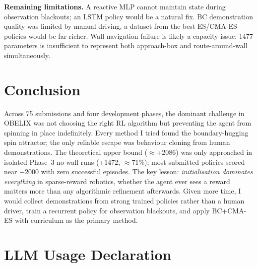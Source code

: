 \documentclass[11pt, oneside]{article}
\begin{document}
\textbf{Remaining limitations.} A reactive MLP cannot maintain state during observation blackouts; an LSTM policy would be a natural fix. BC demonstration quality was limited by manual driving, a dataset from the best ES/CMA-ES policies would be far richer. Wall navigation failure is likely a capacity issue: 1477 parameters is insufficient to represent both approach-box and route-around-wall simultaneously.

\section{Conclusion}

Across 75 submissions and four development phases, the dominant challenge in OBELIX was not choosing the right RL algorithm but preventing the agent from spinning in place indefinitely. Every method I tried found the boundary-hugging spin attractor; the only reliable escape was behaviour cloning from human demonstrations. The theoretical upper bound ($\approx$+2086) was only approached in isolated Phase~3 no-wall runs (+1472, $\approx$71\%); most submitted policies scored near $-2000$ with zero successful episodes. The key lesson: \emph{initialisation dominates everything} in sparse-reward robotics, whether the agent ever sees a reward matters more than any algorithmic refinement afterwards. Given more time, I would collect demonstrations from strong trained policies rather than a human driver, train a recurrent policy for observation blackouts, and apply BC+CMA-ES with curriculum as the primary method.

\section*{LLM Usage Declaration}
\end{document}
